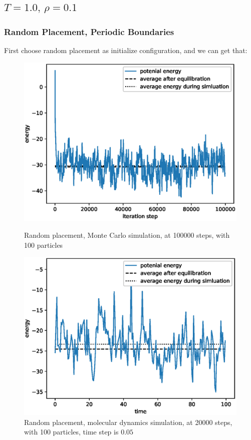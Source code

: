 \documentclass[UTF8,a4paper]{article}
\begin{document}
\subsection{$T =1.0,\, \rho = 0.1$}
\subsubsection{Random Placement, Periodic Boundaries}
First choose random placement as initialize configuration, and we can get that:
\begin{figure}[H]
	\centering
	\begin{minipage}[t]{0.45\textwidth}
		\centering
		\includegraphics[height=0.2\textheight]{fig/exp2_rand_peri_mc.eps}
		\caption{Random placement, Monte Carlo simulation, at 100000 steps, with 100 particles}
	\end{minipage}\hspace{0.5cm}
	\begin{minipage}[t]{0.45\textwidth}
		\centering
		\includegraphics[height=0.2\textheight]{fig/exp2_rand_peri_md.eps}
		\caption{Random placement, molecular dynamics simulation, at 20000 steps, with 100 particles, time step is $0.05$}
	\end{minipage}
\end{figure}
\end{document}
